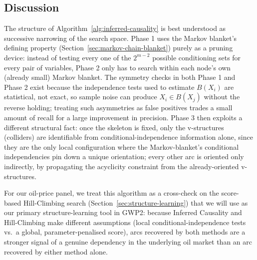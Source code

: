 \subsection{Discussion}

The structure of Algorithm~\ref{alg:inferred-causality} is best understood as
successive narrowing of the search space. Phase 1 uses the Markov blanket's
defining property (Section~\ref{sec:markov-chain-blanket}) purely as a
pruning device: instead of testing every one of the $2^{m-2}$ possible
conditioning sets for every pair of variables, Phase 2 only has to search
within each node's own (already small) Markov blanket. The symmetry checks in
both Phase 1 and Phase 2 exist because the independence tests used to
estimate $B(X_i)$ are statistical, not exact, so sample noise can produce
$X_i \in B(X_j)$ without the reverse holding; treating such asymmetries as
false positives trades a small amount of recall for a large improvement in
precision. Phase 3 then exploits a different structural fact: once the
skeleton is fixed, only the v-structures (colliders) are
identifiable from conditional-independence information alone, since they are
the only local configuration where the Markov-blanket's conditional
independencies pin down a unique orientation; every other arc is oriented
only indirectly, by propagating the acyclicity constraint from the
already-oriented v-structures.

For our oil-price panel, we treat this algorithm as a cross-check on the
score-based Hill-Climbing search (Section~\ref{sec:structure-learning}) that
we will use as our primary structure-learning tool in GWP2: because Inferred Causality and Hill-Climbing make different assumptions (local conditional-independence tests vs.\ a global, parameter-penalised score), arcs
recovered by both methods are a stronger signal of a genuine
dependency in the underlying oil market than an arc recovered by either
method alone.
